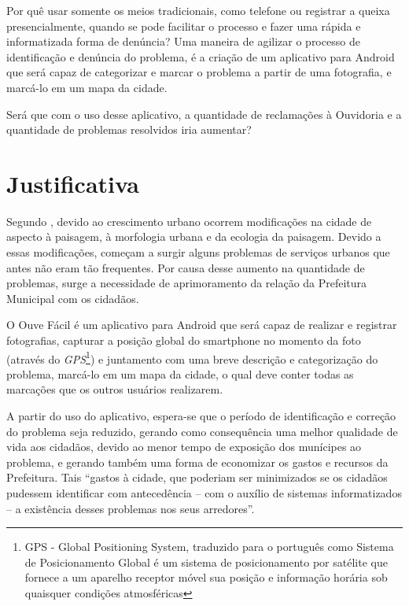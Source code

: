\documentclass[
	12pt,				%
	openright,			%
	oneside,			%
	a4paper,			%
	english,			%
	french,				%
	spanish,			%
	brazil				%
	]{abntex2}
\begin{document}
Por quê usar somente os meios tradicionais, como telefone ou registrar a queixa presencialmente, quando se pode facilitar o processo e fazer uma rápida e informatizada forma de denúncia? Uma maneira de agilizar o processo de identificação e denúncia do problema, é a criação de um aplicativo para Android que será capaz de categorizar e marcar o problema a partir de uma fotografia, e marcá-lo em um mapa da cidade.

Será que com o uso desse aplicativo, a quantidade de reclamações à Ouvidoria e a quantidade de problemas resolvidos iria aumentar?

\chapter[Justificativa]{Justificativa}

Segundo \cite{polidori2005crescimento}, devido ao crescimento urbano ocorrem modificações na cidade de aspecto à paisagem, à morfologia urbana e da ecologia da paisagem. Devido a essas modificações, começam a surgir alguns problemas de serviços urbanos que antes não eram tão frequentes. Por causa desse aumento na quantidade de problemas, surge a necessidade de aprimoramento da relação da Prefeitura Municipal com os cidadãos. 

O Ouve Fácil é um aplicativo para Android que será capaz de realizar e registrar fotografias, capturar a posição global do smartphone no momento da foto (através do \textit{GPS}\footnote{GPS - Global Positioning System, traduzido para o português como Sistema de Posicionamento Global é um sistema de posicionamento por satélite que fornece a um aparelho receptor móvel sua posição e informação horária sob quaisquer condições atmosféricas}) e juntamento com uma breve descrição e categorização do problema, marcá-lo em um mapa da cidade, o qual deve conter todas as marcações que os outros usuários realizarem.

A partir do uso do aplicativo, espera-se que o período de identificação e correção do problema seja reduzido, gerando como consequência uma melhor qualidade de vida aos cidadãos, devido ao menor tempo de exposição dos munícipes ao problema, e gerando também uma forma de economizar os gastos e recursos da Prefeitura. Tais “gastos à cidade, que poderiam ser minimizados se os cidadãos pudessem identificar com antecedência – com o auxílio de sistemas informatizados – a existência desses problemas nos seus arredores”. \cite{rocha2013youonalert}
\end{document}
